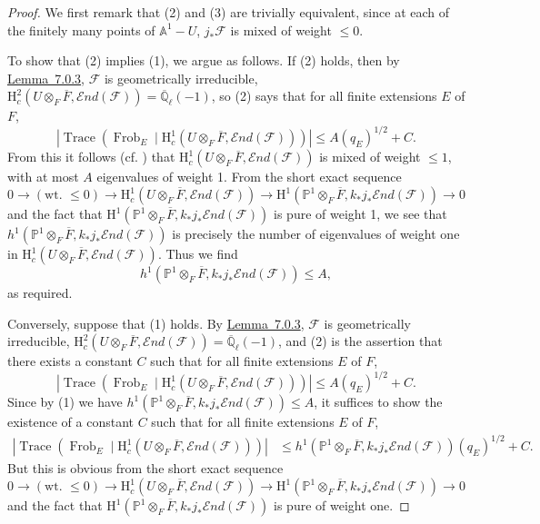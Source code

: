 \begin{proof}
We first remark that (2) and (3) are trivially equivalent, since at each of the finitely many points of \(\mathbb{A}^1-U\), \(j_*\mathcal{F}\) is mixed of weight \(\leq0\).

To show that (2) implies (1), we argue as follows. If (2) holds, then by \hyperref[lem:7.0.3]{Lemma~7.0.3}, \(\mathcal{F}\) is geometrically irreducible, \(\mathrm{H}^2_c(U\otimes_F\overline{F},\mathcal{E}nd(\mathcal{F}))=\overline{\mathbb{Q}}_\ell(-1)\), so (2) says that for all finite extensions \(E\) of \(F\),
\[
\left|\operatorname{Trace}(\operatorname{Frob}_E\mid\mathrm{H}^1_c(U\otimes_F\overline{F},\mathcal{E}nd(\mathcal{F})))\right|\leq A(q_E)^{1/2}+C.
\]
From this it follows (cf. \cite[2.2.1.1]{Ka-SE}) that \(\mathrm{H}^1_c(U\otimes_F\overline{F},\mathcal{E}nd(\mathcal{F}))\) is mixed of weight \(\leq1\), with at most \(A\) eigenvalues of weight 1. From the short exact sequence
\[
0\to(\text{wt. }\leq0)\to \mathrm{H}^1_c(U\otimes_F\overline{F},\mathcal{E}nd(\mathcal{F}))
\to \mathrm{H}^1(\mathbb{P}^1\otimes_F\overline{F},k_*j_*\mathcal{E}nd(\mathcal{F}))\to0
\]
and the fact that \(\mathrm{H}^1(\mathbb{P}^1\otimes_F\overline{F},k_*j_*\mathcal{E}nd(\mathcal{F}))\) is pure of weight 1, we see that \(h^1(\mathbb{P}^1\otimes_F\overline{F},k_*j_*\mathcal{E}nd(\mathcal{F}))\) is precisely the number of eigenvalues of weight one in \(\mathrm{H}^1_c(U\otimes_F\overline{F},\mathcal{E}nd(\mathcal{F}))\). Thus we find
\[
h^1(\mathbb{P}^1\otimes_F\overline{F},k_*j_*\mathcal{E}nd(\mathcal{F}))\leq A,
\]
as required.

Conversely, suppose that (1) holds. By \hyperref[lem:7.0.3]{Lemma~7.0.3}, \(\mathcal{F}\) is geometrically irreducible, \(\mathrm{H}^2_c(U\otimes_F\overline{F},\mathcal{E}nd(\mathcal{F}))=\overline{\mathbb{Q}}_\ell(-1)\), and (2) is the assertion that there exists a constant \(C\) such that for all finite extensions \(E\) of \(F\),
\[
\left|\operatorname{Trace}(\operatorname{Frob}_E\mid\mathrm{H}^1_c(U\otimes_F\overline{F},\mathcal{E}nd(\mathcal{F})))\right|\leq A(q_E)^{1/2}+C.
\]
Since by (1) we have \(h^1(\mathbb{P}^1\otimes_F\overline{F},k_*j_*\mathcal{E}nd(\mathcal{F}))\leq A\), it suffices to show the existence of a constant \(C\) such that for all finite extensions \(E\) of \(F\),
\[
\begin{aligned}
\left|\operatorname{Trace}(\operatorname{Frob}_E\mid\mathrm{H}^1_c(U\otimes_F\overline{F},\mathcal{E}nd(\mathcal{F})))\right|
&\leq h^1(\mathbb{P}^1\otimes_F\overline{F},k_*j_*\mathcal{E}nd(\mathcal{F}))(q_E)^{1/2}+C.
\end{aligned}
\]
But this is obvious from the short exact sequence
\[
0\to(\text{wt. }\leq0)\to \mathrm{H}^1_c(U\otimes_F\overline{F},\mathcal{E}nd(\mathcal{F}))
\to \mathrm{H}^1(\mathbb{P}^1\otimes_F\overline{F},k_*j_*\mathcal{E}nd(\mathcal{F}))\to0
\]
and the fact that \(\mathrm{H}^1(\mathbb{P}^1\otimes_F\overline{F},k_*j_*\mathcal{E}nd(\mathcal{F}))\) is pure of weight one.
\end{proof}

